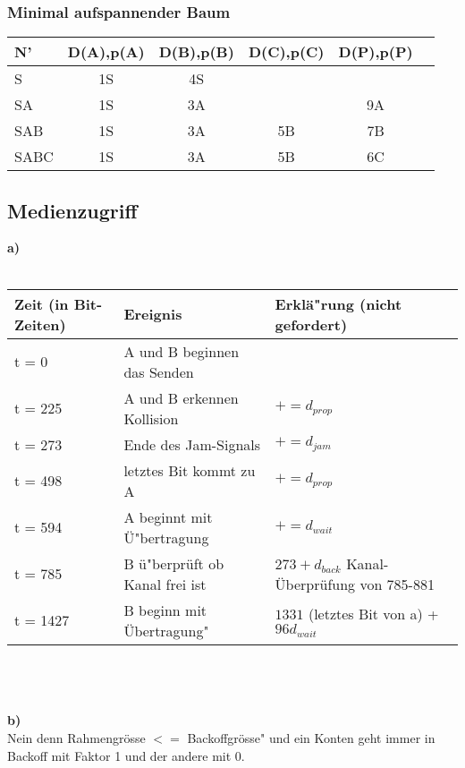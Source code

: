 \documentclass{article}
\begin{document}
			\subsubsection{Minimal aufspannender Baum}
				\begin{tabular}{| l | c | c | c | c | c |}
																								\hline
					N'		&	D(A),p(A)	&	D(B),p(B)	&	D(C),p(C)	&	D(P),p(P) 	\\ \hline
					S		&	1S	&		4S		&				&				  		\\ \hline
					SA		&	1S	&		3A		&				&	9A					\\ \hline
					SAB		&	1S	&		3A		&	5B			&	7B					\\ \hline
					SABC	&	1S	&		3A		&	5B			&	6C					\\ \hline
				\end{tabular}
			\subsection{Medienzugriff}
				\textbf{a)}\\ \\
					\begin{tabular}{|l|l|l|}
						\hline
						Zeit (in Bit-Zeiten)	&	Ereignis			& Erkl\"a"rung (nicht gefordert)	\\ \hline
						t = 0		&	A und B beginnen das Senden		&									\\ \hline
						t = 225 	&	A und B erkennen Kollision		&	$+=d_{prop}$					\\ \hline
						t = 273		&	Ende des Jam-Signals			&	$+=d_{jam}$						\\ \hline
						t = 498		&	letztes Bit kommt zu A			&	$+=d_{prop}$					\\ \hline
						t = 594		&	A beginnt mit \"U"bertragung	&	$+=d_{wait}$					\\ \hline
						t = 785		&	B \"u"berprüft ob Kanal frei ist&	$273+d_{back}$ Kanal-\"Uberpr\"ufung von 785-881	\\ \hline
						t = 1427	&	B beginn mit \"Ubertragung"		&	$1331$ (letztes Bit von a) + $96 d_{wait}$			\\ \hline
					\end{tabular}\\ \\ \\
				\textbf{b)}\\
					Nein denn Rahmengr\"osse $<=$ Backoffgr\"osse" und ein Konten geht immer in Backoff mit Faktor 1 und der andere mit 0.
					\\\\\\
					
\end{document}
